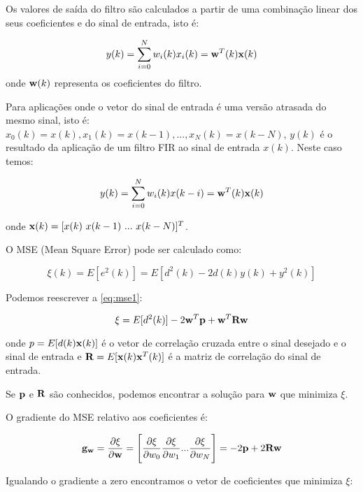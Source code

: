 Os valores de saída do filtro são calculados a partir de uma combinação linear dos seus coeficientes e do sinal de entrada, isto é:

\begin{equation}\label{eq:y}
y(k) = \sum_{i=0}^{N} w_i(k) x_i(k) = {\bf w}^T(k) {\bf x}(k)
\end{equation}
onde ${\bf w}(k)$ representa os coeficientes do filtro.

Para aplicações onde o vetor do sinal de entrada é uma versão atrasada do mesmo sinal, isto é: $x_0(k) = x(k),x_1(k) = x(k - 1),...,x_N(k) = x(k - N)$, $y(k)$ é o resultado da aplicação de um filtro FIR ao sinal de entrada $x(k)$. Neste caso temos:

\begin{equation}
y(k) = \sum_{i=0}^{N} w_i(k) x(k-i) = {\bf w}^T(k) {\bf x}(k)
\end{equation}

onde ${\bf x}(k) = [x(k) \ x(k-1) \ ... \ x(k - N)]^T$.

O  MSE (Mean Square Error) pode ser calculado como:

\begin{equation} \label{eq:mse1}
\xi(k) = E[e^2(k)] = E[d^2(k) - 2d(k)y(k) + y^2(k)]
\end{equation}

Podemos reescrever a \cref{eq:mse1}:

\begin{equation}
\xi = E[d^2(k)] - 2{\bf w}^T{\bf p} + {\bf w}^T {\bf Rw}
\end{equation}

onde $p = E[d(k){\bf x}(k)]$ é o vetor de correlação cruzada entre o sinal desejado e o sinal de entrada e ${\bf R} = E[{\bf x}(k){\bf x}^T(k)]$ é a matriz de correlação do sinal de entrada.

Se ${\bf p}$ e ${\bf R}$ são conhecidos, podemos encontrar a solução para ${\bf w}$ que minimiza $\xi$.

O gradiente do MSE relativo aos coeficientes é:

\begin{equation}
{\bf g_w} = \frac{\partial \xi}{\partial {\bf w}} = 
\Bigg[\frac{\partial \xi}{\partial {w_0}}
\frac{\partial \xi}{\partial {w_1}} ...
\frac{\partial \xi}{\partial {w_N}}
\Bigg] = -2{\bf p} + 2{\bf Rw}
\end{equation}

Igualando o gradiente a zero encontramos o vetor de coeficientes que minimiza $\xi$:

